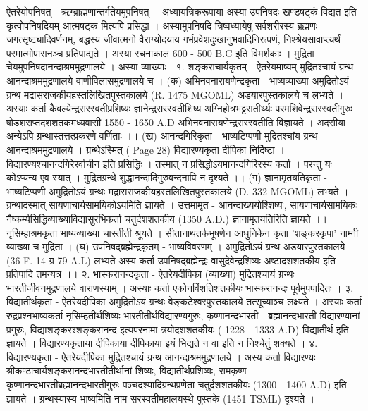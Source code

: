 ऐतरेयोपनिषत् - 
ऋग्ब्राह्मणान्तर्गतेयमुपनिषत् । अध्यायत्रिकरूपाया अस्या उपनिषदः खण्डषट्कं विद्यत इति कृत्वोपनिषदियम् आत्मषट्क मित्यपि प्रसिद्धा । अस्यामुपनिषदि त्रिष्वध्यायेषु सर्वशरीरस्य ब्रह्मणः जगत्सृष्ट्यादिवर्णनम्, बद्धस्य जीवात्मनो वैराग्योदयाय गर्भप्रवेशदुःखानुभवादिनिरूपणं, निश्श्रेयसावाप्त्यर्थं परमात्मोपासनञ्च प्रतिपाद्यते । अस्या रचनाकाल 600 - 500 B.C इति विमर्शकाः । मुद्रिता चेयमुपनिषदानन्दाश्रममुद्रणालये । अस्या व्याख्याः - 
१. शङ्कराचार्यकृतम् - ऐतरेयमाष्यम् 
मुद्रितश्चायं ग्रन्थ आनन्दाश्रममुद्रणालये वाणीविलासमुद्रणालये च । 
(क) अभिनवनारायणेन्द्रकृता - भाष्यव्याख्या 
अमुद्रितोऽयं ग्रन्थ मद्रासराजकीयहस्तलिखितपुस्तकालये (R. 1475 MGOML) अडयारपुस्तकालये च लभ्यते । 
अस्याः कर्ता कैवल्येन्द्रसरस्वतीप्रशिष्यः ज्ञानेन्द्रसरस्वतीशिष्य अग्निहोत्रभट्टसतीर्थ्यः परमशिवेन्द्रसरस्वतीगुरुः षोडशसप्तदशशतकमध्यवासी 1550 - 1650 A.D अभिनवनारायणेन्द्रसरस्वतीति विज्ञायते । अदसीया अन्येऽपि ग्रन्थास्तत्तत्प्रकरणे वर्णिताः ।।
(ख) आनन्दगिरिकृता - भाष्यटिप्पणी 
मुद्रितश्चांय ग्रन्थ आनन्दाश्रममुद्रणालये । ग्रन्थेऽस्मित् ( Page 28) विद्यारण्यकृता दीपिका निर्दिष्टा । विद्यारण्यश्चानन्दगिरेरर्वाचीन इति प्रसिद्धिः । 
तस्मात् न प्रसिद्धोऽयमानन्दगिरिरस्य कर्ता । परन्तु यः कोऽप्यन्य एव स्यात् । मुद्रितग्रन्थे शुद्धानन्दादिगुरुवन्दनापि न दृश्यते ।। 
(ग) ज्ञानामृतयतिकृता - भाष्यटिप्पणी 
अमुद्रितोऽयं ग्रन्थः मद्रासराजकीयहस्तलिखितपुस्तकालये (D. 332 MGOML) लभ्यते । ग्रन्थादस्मात् सायणाचार्यसामयिकोऽयमिति ज्ञायते । उत्तमामृत - आनन्दाख्ययोश्शिष्यः, सायणाचार्यसामयिकः नैष्कर्म्यसिद्धिव्याख्याविद्यासुरभिकर्ता चतुर्दशशतकीय (1350 A.D.) ज्ञानामृतयतिरिति ज्ञायते ।। नृसिम्हाश्रमकृता भाष्यव्याख्या चास्तीती श्रूयते । सीतानाथतर्कभूषणेन आधुनिकेन कृता 'शङ्करकृपा' नाम्नी व्याख्या च मुद्रिता ।  
(घ) उपनिषद्ब्रह्मेन्द्रकृतम् - भाष्यविवरणम् ।
अमुद्रितोऽयं ग्रन्थ अडयारपुस्तकालये (36 F. 14 ग्र 79 A.L) लभ्यते अस्य कर्ता उपनिषद्ब्रह्मेन्द्रः वासुदेवेन्द्रशिष्यः अष्टादशशतकीय इति प्रतिपादि तमन्यत्र ।। 
२. भास्करानन्दकृता - ऐतरेयदीपिका (व्याख्या)
मुद्रितश्चायं ग्रन्थः भारतीजीवनमुद्रणालये वाराणस्याम् । अस्याः कर्ता एकोनविंशतिशतकीयः भास्करानन्दः पूर्वमुपपादितः ।
३. विद्यातीर्थकृता - ऐतरेयदीपिका 
अमुद्रितोऽयं ग्रन्थः वेङ्कटेश्वरपुस्तकालये तत्सूच्याञ्च लक्ष्यते । अस्याः कर्ता रुद्रप्रश्नभाष्यकर्ता नृसिम्हतीर्थशिष्यः भारतीतीर्थविद्यारण्यगुरुः, कृष्णानन्दभारती - ब्रह्मानन्दभारती-विद्यारण्यानां प्रगुरुः, विद्याशङ्करश्शङ्करानन्द इत्यपरनामा त्रयोदशशतकीयः ( 1228 - 1333 A.D) विद्यातीर्थ इति ज्ञायते । विद्यारण्यकृताया दीपिकाया दीपिकाया इयं भिद्यते न वा इति न निश्चेतुं शक्यते । 
४. विद्यारण्यकृता - ऐतरेयदीपिका 
मुद्रितश्चायं ग्रन्थ आनन्दाश्रममुद्रणालये । अस्य कर्ता विद्यारण्यः श्रीकण्ठाचार्यशङ्करानन्दभारतीतीर्थानां शिष्यः, विद्यातीर्थप्रशिष्यः, रामकृष्ण - कृष्णानन्दभारतीब्रह्मानन्दभारतीगुरुः पञ्चदश्यादिग्रन्थप्रणेता चतुर्दशशतकीयः (1300 - 1400 A.D) इति ज्ञायते । ग्रन्थस्यास्य भाष्यमिति नाम सरस्वतीमहालयस्थे पुस्तके (1451 TSML) दृश्यते । 

